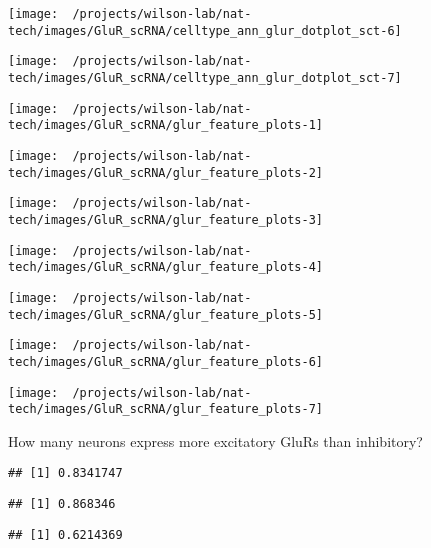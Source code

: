\documentclass[
]{article}
\begin{document}
\begin{center}\texttt{[image: ~/projects/wilson-lab/nat-tech/images/GluR\_scRNA/celltype\_ann\_glur\_dotplot\_sct-6]} \end{center}

\begin{center}\texttt{[image: ~/projects/wilson-lab/nat-tech/images/GluR\_scRNA/celltype\_ann\_glur\_dotplot\_sct-7]} \end{center}

\begin{center}\texttt{[image: ~/projects/wilson-lab/nat-tech/images/GluR\_scRNA/glur\_feature\_plots-1]} \end{center}

\begin{center}\texttt{[image: ~/projects/wilson-lab/nat-tech/images/GluR\_scRNA/glur\_feature\_plots-2]} \end{center}

\begin{center}\texttt{[image: ~/projects/wilson-lab/nat-tech/images/GluR\_scRNA/glur\_feature\_plots-3]} \end{center}

\begin{center}\texttt{[image: ~/projects/wilson-lab/nat-tech/images/GluR\_scRNA/glur\_feature\_plots-4]} \end{center}

\begin{center}\texttt{[image: ~/projects/wilson-lab/nat-tech/images/GluR\_scRNA/glur\_feature\_plots-5]} \end{center}

\begin{center}\texttt{[image: ~/projects/wilson-lab/nat-tech/images/GluR\_scRNA/glur\_feature\_plots-6]} \end{center}

\begin{center}\texttt{[image: ~/projects/wilson-lab/nat-tech/images/GluR\_scRNA/glur\_feature\_plots-7]} \end{center}

How many neurons express more excitatory GluRs than inhibitory?

\begin{verbatim}
## [1] 0.8341747
\end{verbatim}

\begin{verbatim}
## [1] 0.868346
\end{verbatim}

\begin{verbatim}
## [1] 0.6214369
\end{verbatim}
\end{document}
